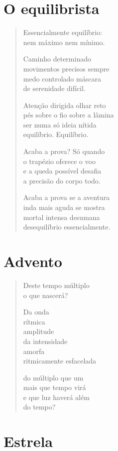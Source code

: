 \chapter{O equilibrista}

\begin{verse}
Essencialmente equilíbrio:\\
nem máximo nem mínimo.

Caminho determinado\\
movimentos precisos sempre\\
medo controlado máscara\\
de serenidade difícil.

Atenção dirigida olhar reto\\
pés sobre o fio sobre a lâmina\\
ser numa só ideia nítida\\
equilíbrio. Equilíbrio.

Acaba a prova? Só quando\\
o trapézio oferece o voo\\
e a queda possível desafia\\
a precisão do corpo todo.

Acaba a prova se a aventura\\
inda mais aguda se mostra\\
mortal intensa desumana\\
desequilíbrio essencialmente.
\end{verse}

\chapter{Advento}

\begin{verse}
Deste tempo múltiplo\\
o que nascerá?

Da onda\\
rítmica\\
amplitude\\
da intensidade\\
amorfa\\
ritmicamente esfacelada

do múltiplo que um\\
mais que tempo virá\\
e que luz haverá além\\
do tempo?
\end{verse}

\chapter{Estrela}

